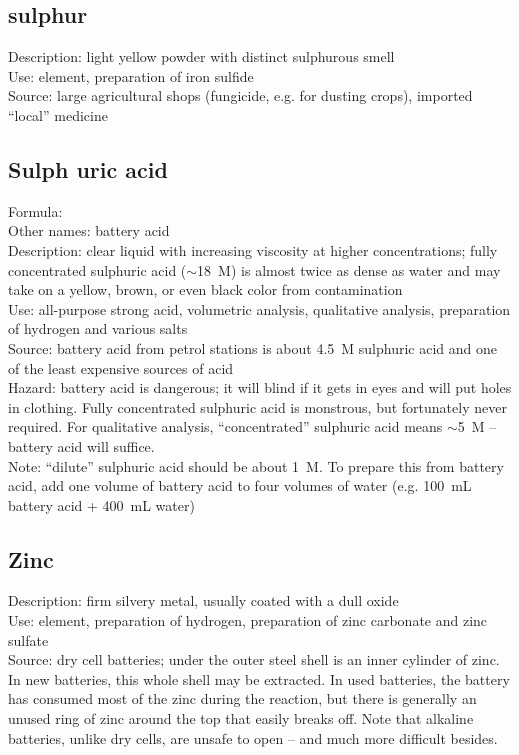 \subsection{sulphur}
Description: light yellow powder with distinct sulphurous smell\\
Use: element, 
preparation of iron sulfide\\
Source: large agricultural shops (fungicide, 
e.g. 
for dusting crops), 
imported ``local'' medicine
\subsection{Sulph
uric acid}
Formula: \\
Other names: battery acid\\
Description: clear liquid with increasing viscosity at higher concentrations; 
fully concentrated sulphuric acid ($\sim$18~M) is almost twice as dense as water 
and may take on a yellow, 
brown, 
or even black color from contamination\\
Use: all-purpose strong acid, 
volumetric analysis, 
qualitative analysis, 
preparation of hydrogen and various salts\\
Source: battery acid from petrol stations 
is about 4.5~M sulphuric acid and one of the least expensive sources of acid\\
Hazard: battery acid is dangerous; 
it will blind if it gets in eyes and will put holes in clothing. 
Fully concentrated sulphuric acid is monstrous, 
but fortunately never required. 
For qualitative analysis, 
``concentrated'' sulphuric acid means $\sim$5~M -- battery acid will suffice.\\
Note: ``dilute'' sulphuric acid should be about 1~M. 
To prepare this from battery acid, 
add one volume of battery acid to four volumes of water (e.g. 
100~mL battery acid + 400~mL water)
\subsection{Zinc}
\label{sec:zinc}
Description: firm silvery metal, 
usually coated with a dull oxide\\
Use: element, 
preparation of hydrogen, 
preparation of zinc carbonate and zinc sulfate\\
Source: dry cell batteries; 
under the outer steel shell is an inner cylinder of zinc. 
In new batteries, 
this whole shell may be extracted. 
In used batteries, 
the battery has consumed most of the zinc during the reaction, 
but there is generally an unused ring of zinc around the top 
that easily breaks off. 
Note that alkaline batteries, 
unlike dry cells, 
are unsafe to open -- and much more difficult besides.